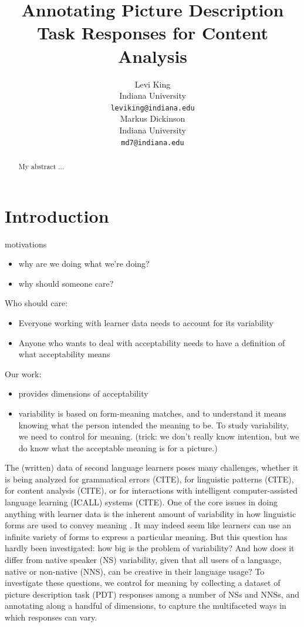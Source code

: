 \documentclass[11pt,a4paper]{article}
\title{Annotating Picture Description Task Responses for Content Analysis}
\author{Levi King \\
  Indiana University \\
  {\tt leviking@indiana.edu} \\\And
  Markus Dickinson \\
  Indiana University \\
  {\tt md7@indiana.edu} \\}
\date{}
\begin{document}
\maketitle
\begin{abstract}
My abstract ...

\end{abstract}


\section{Introduction}

motivations
\begin{itemize}
\item why are we doing what we're doing?
\item why should someone care?
\end{itemize}

Who should care:
\begin{itemize}
\item Everyone working with learner data needs to account for its variability
\item Anyone who wants to deal with acceptability needs to have a definition of what acceptability means
\end{itemize}

Our work:
\begin{itemize}
\item provides dimensions of acceptability
\item variability is based on form-meaning matches, and to understand it means knowing what the person intended the meaning to be.  To study variability, we need to control for meaning.  (trick: we don't really know intention, but we do know what the acceptable meaning is for a picture.)
\end{itemize}

The (written) data of second language learners poses many challenges,
whether it is being analyzed for grammatical errors (CITE), for
linguistic patterns (CITE), for content analysis (CITE), or for
interactions with intelligent computer-assisted language learning
(ICALL) systems (CITE).  One of the core issues in doing anything with
learner data is the inherent amount of variability in how linguistic
forms are used to convey meaning \citep{Meurers.Dickinson-17}.
It may indeed seem like learners can use an infinite variety of forms
to express a particular meaning.  But this question has hardly been
investigated: how big is the problem of variability?  And how does it
differ from native speaker (NS) variability, given that all users of a
language, native or non-native (NNS), can be creative in their
language usage?  To investigate these questions, we control for
meaning by collecting a dataset of picture description task (PDT)
responses among a number of NSs and NNSs, and annotating along a
handful of dimensions, to capture the multifaceted ways in which
responses can vary.
\end{document}

